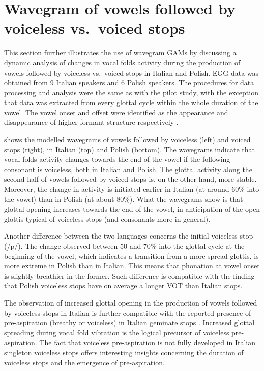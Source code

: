 \documentclass[12pt,a4paper,]{article}
\begin{document}
\hypertarget{wavegram-of-vowels-followed-by-voiceless-vs.-voiced-stops}{%
\section{Wavegram of vowels followed by voiceless vs.~voiced
stops}\label{wavegram-of-vowels-followed-by-voiceless-vs.-voiced-stops}}

This section further illustrates the use of wavegram GAMs by discussing
a dynamic analysis of changes in vocal folds activity during the
production of vowels followed by voiceless vs.~voiced stops in Italian
and Polish. EGG data was obtained from 9 Italian speakers and 6 Polish
speakers. The procedures for data processing and analysis were the same
as with the pilot study, with the exception that data was extracted from
every glottal cycle within the whole duration of the vowel. The vowel
onset and offset were identified as the appearance and disappearance of
higher formant structure respectively \citep{machac2009}.

 shows the modelled wavegrams of vowels followed by
voiceless (left) and voiced stops (right), in Italian (top) and Polish
(bottom). The wavegrams indicate that vocal folds activity changes
towards the end of the vowel if the following consonant is voiceless,
both in Italian and Polish. The glottal activity along the second half
of vowels followed by voiced stops is, on the other hand, more stable.
Moreover, the change in activity is initiated earlier in Italian (at
around 60\% into the vowel) than in Polish (at about 80\%). What the
wavegrams show is that glottal opening increases towards the end of the
vowel, in anticipation of the open glottis typical of voiceless stops
(and consonants more in general).

Another difference between the two languages concerns the initial
voiceless stop (/p/). The change observed between 50 and 70\% into the
glottal cycle at the beginning of the vowel, which indicates a
transition from a more spread glottis, is more extreme in Polish than in
Italian. This means that phonation at vowel onset is slightly breathier
in the former. Such difference is compatible with the finding that
Polish voiceless stops have on average a longer VOT than Italian stops.

The observation of increased glottal opening in the production of vowels
followed by voiceless stops in Italian is further compatible with the
reported presence of pre-aspiration (breathy or voiceless) in Italian
geminate stops
\citep{stevens2004, stevens2004a, stevens2010, stevens2010b, stevens2014a}.
Increased glottal spreading during vocal fold vibration is the logical
precursor of voiceless pre-aspiration. The fact that voiceless
pre-aspiration is not fully developed in Italian singleton voiceless
stops offers interesting insights concerning the duration of voiceless
stops and the emergence of pre-aspiration.
\end{document}
